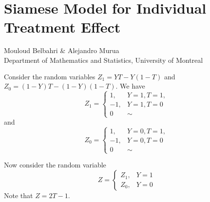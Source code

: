 \documentclass[10pt]{article}
\begin{document}
\section*{Siamese Model for Individual Treatment Effect}

{\centering
   Mouloud Belbahri \&  Alejandro Murua \\
  Department of Mathematics and Statistics, 
  University of Montreal
}

\vspace{30pt}



Consider the random variables $Z_1 = YT - Y(1-T)$ and $Z_0 = (1-Y)T - (1-Y)(1-T)$.
We have
\[ Z_1 = \left\{ \begin{array}{cc} 1, &  Y=1, T=1, \\ -1, & Y=1, T=0\\ 0 & \sim \end{array} \right.
\]
and
\[ Z_0 = \left\{ \begin{array}{cc} 1, &  Y=0, T=1, \\ -1, & Y=0, T=0\\ 0 & \sim \end{array} \right.
\]

Now consider the random variable
\[ Z = \left\{ \begin{array}{cc} Z_1, &  Y=1 \\ Z_0, & Y=0 \end{array} \right.
\]
Note that $Z= 2T -1 $.
\end{document}
